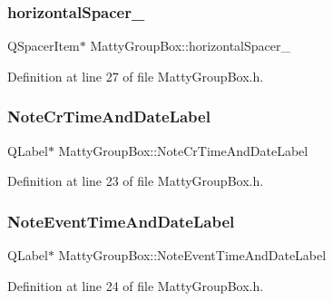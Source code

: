\subsubsection{\texorpdfstring{horizontal\+Spacer\+\_}{horizontalSpacer\_2}}
{\footnotesize\ttfamily Q\+Spacer\+Item$\ast$ Matty\+Group\+Box\+::horizontal\+Spacer\+\_\hspace{0.3cm}{\ttfamily [private]}}



Definition at line 27 of file Matty\+Group\+Box.\+h.

\hypertarget{classMattyGroupBox_a1a71503d5ede703b934e4f02d932a038}{}\label{classMattyGroupBox_a1a71503d5ede703b934e4f02d932a038} 
\subsubsection{\texorpdfstring{Note\+Cr\+Time\+And\+Date\+Label}{NoteCrTimeAndDateLabel}}
{\footnotesize\ttfamily Q\+Label$\ast$ Matty\+Group\+Box\+::\+Note\+Cr\+Time\+And\+Date\+Label\hspace{0.3cm}{\ttfamily [private]}}



Definition at line 23 of file Matty\+Group\+Box.\+h.

\hypertarget{classMattyGroupBox_a97b192413385021b01b34db7493f8b49}{}\label{classMattyGroupBox_a97b192413385021b01b34db7493f8b49} 
\subsubsection{\texorpdfstring{Note\+Event\+Time\+And\+Date\+Label}{NoteEventTimeAndDateLabel}}
{\footnotesize\ttfamily Q\+Label$\ast$ Matty\+Group\+Box\+::\+Note\+Event\+Time\+And\+Date\+Label\hspace{0.3cm}{\ttfamily [private]}}



Definition at line 24 of file Matty\+Group\+Box.\+h.

\hypertarget{classMattyGroupBox_a2243d04d95c060e516fa3a43f09f19ef}{}\label{classMattyGroupBox_a2243d04d95c060e516fa3a43f09f19ef} 

